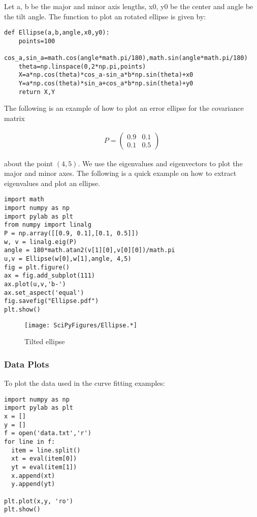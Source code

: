 Let a, b be the major and minor axis lengths, x0, y0 be the center and
angle be the tilt angle. The function to plot an rotated ellipse is
given by:

\begin{verbatim}
def Ellipse(a,b,angle,x0,y0):
    points=100
    cos_a,sin_a=math.cos(angle*math.pi/180),math.sin(angle*math.pi/180)
    theta=np.linspace(0,2*np.pi,points)
    X=a*np.cos(theta)*cos_a-sin_a*b*np.sin(theta)+x0
    Y=a*np.cos(theta)*sin_a+cos_a*b*np.sin(theta)+y0
    return X,Y
\end{verbatim}

The following is an example of how to plot an error ellipse for the
covariance matrix

\[\begin{aligned}
P = \begin{pmatrix} 0.9 & 0.1 \\ 0.1 & 0.5 \end{pmatrix}
\end{aligned}\]

about the point \((4,5)\). We use the eigenvalues and eigenvectors to
plot the major and minor axes. The following is a quick example on how
to extract eigenvalues and plot an ellipse.

\begin{verbatim}
import math
import numpy as np
import pylab as plt
from numpy import linalg
P = np.array([[0.9, 0.1],[0.1, 0.5]])
w, v = linalg.eig(P)
angle = 180*math.atan2(v[1][0],v[0][0])/math.pi
u,v = Ellipse(w[0],w[1],angle, 4,5)
fig = plt.figure()
ax = fig.add_subplot(111)
ax.plot(u,v,'b-')
ax.set_aspect('equal')
fig.savefig("Ellipse.pdf")
plt.show()
\end{verbatim}

\begin{figure}
\centering
\texttt{[image: SciPyFigures/Ellipse.*]}
\caption{Tilted ellipse}
\end{figure}

\hypertarget{data-plots}{%
\subsubsection{Data Plots}\label{data-plots}}

To plot the data used in the curve fitting examples:

\begin{verbatim}
import numpy as np
import pylab as plt
x = []
y = []
f = open('data.txt','r')
for line in f:
  item = line.split()
  xt = eval(item[0])
  yt = eval(item[1])
  x.append(xt)
  y.append(yt)

plt.plot(x,y, 'ro')
plt.show()
\end{verbatim}


